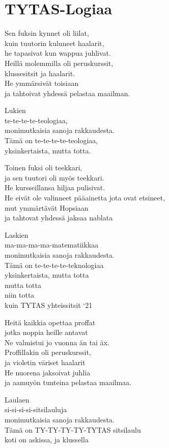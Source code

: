 \section{TYTAS-Logiaa}
Sen fuksin kynnet oli liilat,\\
kuin tuutorin kuluneet haalarit,\\
he tapasivat kun wappua juhlivat.\\
Heillä molemmilla oli peruskurssit,\\
klussesitsit ja haalarit.\\
He ymmärsivät toisiaan\\
ja tahtoivat yhdessä pelastaa maailman.

Lukien\\
te-te-te-te-teologiaa,\\
monimutkaisia sanoja rakkaudesta.\\
Tämä on te-te-te-te-teologiaa,\\
yksinkertaista, mutta totta.

Toinen fuksi oli teekkari,\\
ja sen tuutori oli myös teekkari.\\
He kursseillansa hiljaa pulisivat.\\
He eivät ole valinneet pääainetta jota ovat etsineet,\\
mut ymmärtävät Hopsiaan\\
ja tahtovat yhdessä jaksaa nablata

Laskien\\
ma-ma-ma-ma-matematiikkaa\\
monimutkaisia sanoja rakkaudesta.\\
Tämä on te-te-te-te-teknologiaa\\
yksinkertaista, mutta totta\\
mutta totta\\
niin totta\\
kuin TYTAS yhteissitsit ‘21

Heitä kaikkia opettaa proffat\\
jotka noppia heille antavat\\
Ne valmistui jo vuonna än tai äx.\\
Proffillakin oli peruskurssit,\\
ja violetin väriset haalarit\\
He nuorena jaksoivat juhlia\\
ja aamuyön tunteina pelastaa maailmaa.

Laulaen\\
si-si-si-si-sitsilauluja\\
monimutkaisia sanoja rakkaudesta.\\
Tämä on TY-TY-TY-TY-TYTAS sitsilaulu\\
koti on askissa, ja klussella